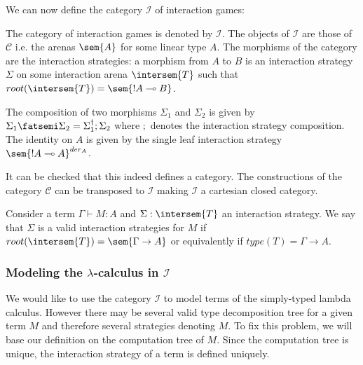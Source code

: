 We can now define the category $\mathcal{I}$ of interaction games:
\begin{dfn}
The category of interaction games is denoted by $\mathcal{I}$. The
objects of $\mathcal{I}$ are those of $\mathcal{C}$ i.e. the arenas $\sem{A}$ for some linear type $A$. The morphisms of
the category are the interaction strategies: a morphism from $A$
to $B$ is an interaction strategy $\Sigma$ on some interaction arena
$\intersem{T}$ such that $root(\intersem{T}) = \sem{!A\multimap B}$.

The composition of two morphisms $\Sigma_1$ and $\Sigma_2$ is given by
$\Sigma_1 \fatsemi \Sigma_2 = \Sigma_1^\dagger ; \Sigma_2$ where $;$ denotes
the interaction strategy composition.
The identity on $A$ is given by the single leaf interaction strategy $\sem{!A \multimap A}^{der_A}$.
\end{dfn}

It can be checked that this indeed defines a category. The constructions of the category $\mathcal{C}$ can be transposed to $\mathcal{I}$
making $\mathcal{I}$ a cartesian closed category.


\begin{dfn}
Consider a term $\Gamma \vdash M : A$ and $\Sigma : \intersem{T}$ an
interaction strategy. We say that $\Sigma$ is a valid interaction
strategies for $M$ if $root(\intersem{T}) = \sem{\Gamma \rightarrow
A}$ or equivalently if $type(T) = \Gamma \rightarrow A$.
\end{dfn}


\subsubsection{Modeling the $\lambda$-calculus in $\mathcal{I}$}

We would like to use the category $\mathcal{I}$ to model terms of
the simply-typed lambda calculus. However there may be several valid
type decomposition tree for a given term $M$ and therefore several
strategies denoting $M$. To fix this problem, we will base our
definition on the computation tree of $M$. Since the computation
tree is unique, the interaction strategy of a term is defined
uniquely.

